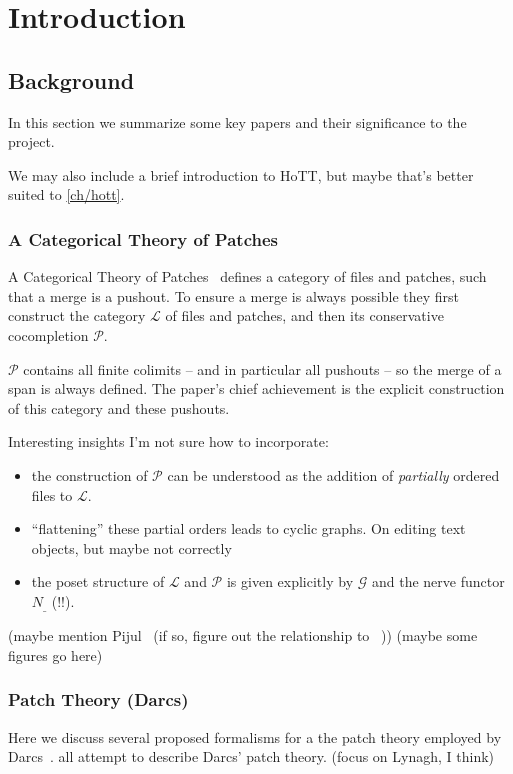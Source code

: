 \chapter{Introduction}

\section{Background}
In this section we summarize some key papers and their significance to the
project.

We may also include a brief introduction to HoTT, but maybe that's better suited
to \ref{ch/hott}.

\subsection{A Categorical Theory of Patches}
A Categorical Theory of Patches~\cite{Categorical2013} defines a category of
files and patches, such that a merge is a pushout. To ensure a merge is always
possible they first construct the category $\mathcal{L}$ of files and patches,
and then its conservative cocompletion $\mathcal{P}$.

$\mathcal{P}$ contains all finite colimits -- and in particular all pushouts --
so the merge of a span is always defined. The paper's chief achievement is the
explicit construction of this category and these pushouts.

Interesting insights I'm not sure how to incorporate:
\begin{itemize}
\item the construction of $\mathcal{P}$ can be understood as the addition of \emph{partially} ordered
  files to $\mathcal{L}$.
\item ``flattening'' these partial orders leads to cyclic graphs. On editing
  text~\cite{editing2014} objects, but maybe not correctly
\item the poset structure of $\mathcal{L}$ and $\mathcal{P}$ is given explicitly
  by $\mathcal{G}$ and the nerve functor $N_{\_}$ (!!).
\end{itemize}

(maybe mention Pijul~\cite{Pijul} (if so, figure out the relationship to ~\cite{Categorical2013}))
(maybe some figures go here)

\subsection{Patch Theory (Darcs)}
Here we discuss several proposed formalisms for a the patch theory employed by
Darcs~\cite{Darcs}. \cite{Lynagh2006, Sittampalam2005, Dagit2009} all attempt to
describe Darcs' patch theory. (focus on Lynagh, I think)

